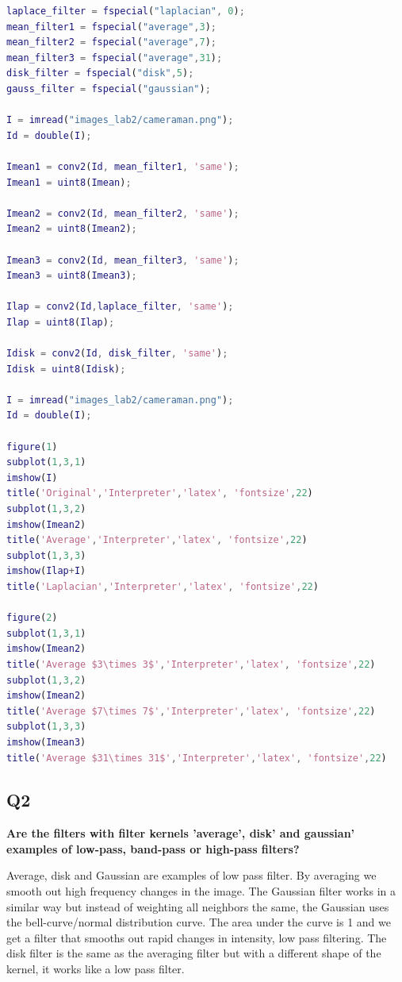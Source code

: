 \documentclass[oneside,a4paper]{article}
\begin{document}
\begin{lstlisting}[language=MATLAB]
laplace_filter = fspecial("laplacian", 0);
mean_filter1 = fspecial("average",3);
mean_filter2 = fspecial("average",7);
mean_filter3 = fspecial("average",31);
disk_filter = fspecial("disk",5);
gauss_filter = fspecial("gaussian");

I = imread("images_lab2/cameraman.png");
Id = double(I);

Imean1 = conv2(Id, mean_filter1, 'same');
Imean1 = uint8(Imean); 

Imean2 = conv2(Id, mean_filter2, 'same');
Imean2 = uint8(Imean2); 

Imean3 = conv2(Id, mean_filter3, 'same');
Imean3 = uint8(Imean3); 

Ilap = conv2(Id,laplace_filter, 'same');
Ilap = uint8(Ilap);

Idisk = conv2(Id, disk_filter, 'same');
Idisk = uint8(Idisk); 

I = imread("images_lab2/cameraman.png");
Id = double(I);

figure(1)
subplot(1,3,1)
imshow(I)
title('Original','Interpreter','latex', 'fontsize',22)
subplot(1,3,2)
imshow(Imean2)
title('Average','Interpreter','latex', 'fontsize',22)
subplot(1,3,3)
imshow(Ilap+I)
title('Laplacian','Interpreter','latex', 'fontsize',22)

figure(2)
subplot(1,3,1)
imshow(Imean2)
title('Average $3\times 3$','Interpreter','latex', 'fontsize',22)
subplot(1,3,2)
imshow(Imean2)
title('Average $7\times 7$','Interpreter','latex', 'fontsize',22)
subplot(1,3,3)
imshow(Imean3)
title('Average $31\times 31$','Interpreter','latex', 'fontsize',22)
\end{lstlisting}

\subsection*{Q2}
\noindent \textbf{Are the filters with filter kernels ’average’, disk’ and gaussian’ examples of low-pass, band-pass or high-pass filters?}

Average, disk and Gaussian are examples of low pass filter. By averaging we smooth out high frequency changes in the image. The Gaussian filter works in a similar way but instead of weighting all neighbors the same, the Gaussian uses the bell-curve/normal distribution curve. The area under the curve is 1 and we get a filter that smooths out rapid changes in intensity, low pass filtering. 
The disk filter is the same as the averaging filter but with a different shape of the kernel, it works like a low pass filter. 
\end{document}
